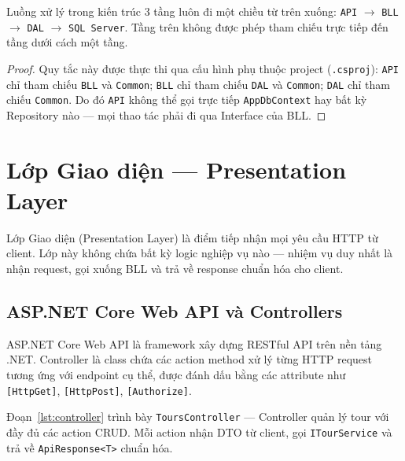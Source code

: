 \begin{thm}\label{thm3.1}
Luồng xử lý trong kiến trúc 3 tầng luôn đi một chiều từ trên
xuống: \texttt{API} $\rightarrow$ \texttt{BLL} $\rightarrow$
\texttt{DAL} $\rightarrow$ \texttt{SQL Server}. Tầng trên không
được phép tham chiếu trực tiếp đến tầng dưới cách một tầng.
\end{thm}

\noindent\begin{proof}
Quy tắc này được thực thi qua cấu hình phụ thuộc project
(\texttt{.csproj}): \texttt{API} chỉ tham chiếu \texttt{BLL}
và \texttt{Common}; \texttt{BLL} chỉ tham chiếu \texttt{DAL}
và \texttt{Common}; \texttt{DAL} chỉ tham chiếu \texttt{Common}.
Do đó \texttt{API} không thể gọi trực tiếp \texttt{AppDbContext}
hay bất kỳ Repository nào — mọi thao tác phải đi qua Interface
của BLL. \QEDAa
\end{proof}


\section{Lớp Giao diện — Presentation Layer}\label{Sec3.2}

Lớp Giao diện (Presentation Layer) là điểm tiếp nhận mọi
yêu cầu HTTP từ client. Lớp này không chứa bất kỳ logic
nghiệp vụ nào — nhiệm vụ duy nhất là nhận request, gọi
xuống BLL và trả về response chuẩn hóa cho client.

\subsection{ASP.NET Core Web API và Controllers}\label{sub3.2.1}

\begin{de}\label{def3.2}
ASP.NET Core Web API là framework xây dựng RESTful API trên
nền tảng .NET. Controller là class chứa các action method xử
lý từng HTTP request tương ứng với endpoint cụ thể, được
đánh dấu bằng các attribute như \texttt{[HttpGet]},
\texttt{[HttpPost]}, \texttt{[Authorize]}.
\end{de}

Đoạn~\ref{lst:controller} trình bày \texttt{ToursController}
— Controller quản lý tour với đầy đủ các action CRUD.
Mỗi action nhận DTO từ client, gọi \texttt{ITourService}
và trả về \texttt{ApiResponse<T>} chuẩn hóa.

